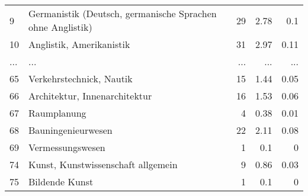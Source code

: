\begin{longtable}{lXrrr}
        9 & \multicolumn{1}{X}{Germanistik (Deutsch, germanische Sprachen ohne Anglistik)} & %
          \num{29} &
          \num[round-mode=places,round-precision=2]{2,78} &
          \num[round-mode=places,round-precision=2]{0,1} \\
        10 & \multicolumn{1}{X}{Anglistik, Amerikanistik} & %
          \num{31} &
          \num[round-mode=places,round-precision=2]{2,97} &
          \num[round-mode=places,round-precision=2]{0,11} \\
       ... & ... & ... & ... & ... \\
        65 & \multicolumn{1}{X}{Verkehrstechnick, Nautik} & %
          \num{15} &
          \num[round-mode=places,round-precision=2]{1,44} &
          \num[round-mode=places,round-precision=2]{0,05} \\

        66 & \multicolumn{1}{X}{Architektur, Innenarchitektur} & %
          \num{16} &
          \num[round-mode=places,round-precision=2]{1,53} &
          \num[round-mode=places,round-precision=2]{0,06} \\

        67 & \multicolumn{1}{X}{Raumplanung} & %
          \num{4} &
          \num[round-mode=places,round-precision=2]{0,38} &
          \num[round-mode=places,round-precision=2]{0,01} \\

        68 & \multicolumn{1}{X}{Bauningenieurwesen} & %
          \num{22} &
          \num[round-mode=places,round-precision=2]{2,11} &
          \num[round-mode=places,round-precision=2]{0,08} \\

        69 & \multicolumn{1}{X}{Vermessungswesen} & %
          \num{1} &
          \num[round-mode=places,round-precision=2]{0,1} &
          \num[round-mode=places,round-precision=2]{0} \\

        74 & \multicolumn{1}{X}{Kunst, Kunstwissenschaft allgemein} & %
          \num{9} &
          \num[round-mode=places,round-precision=2]{0,86} &
          \num[round-mode=places,round-precision=2]{0,03} \\

        75 & \multicolumn{1}{X}{Bildende Kunst} & %
          \num{1} &
          \num[round-mode=places,round-precision=2]{0,1} &
          \num[round-mode=places,round-precision=2]{0} \\


\end{longtable}
